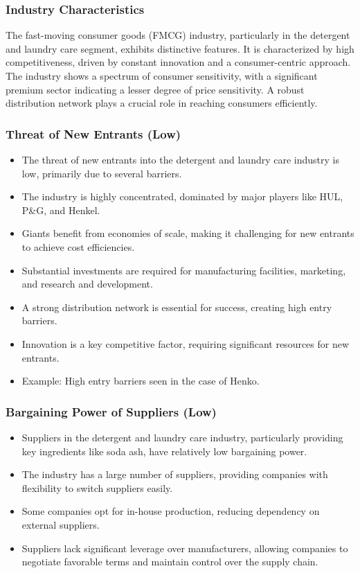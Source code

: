 \subsubsection{Industry Characteristics}
The fast-moving consumer goods (FMCG) industry, particularly in the detergent and laundry care segment, exhibits distinctive features. It is characterized by high competitiveness, driven by constant innovation and a consumer-centric approach. The industry shows a spectrum of consumer sensitivity, with a significant premium sector indicating a lesser degree of price sensitivity. A robust distribution network plays a crucial role in reaching consumers efficiently.

\subsubsection{Threat of New Entrants (Low)}
\begin{itemize}
  \item The threat of new entrants into the detergent and laundry care industry is low, primarily due to several barriers.
  \item The industry is highly concentrated, dominated by major players like HUL, P\&G, and Henkel.
  \item Giants benefit from economies of scale, making it challenging for new entrants to achieve cost efficiencies.
  \item Substantial investments are required for manufacturing facilities, marketing, and research and development.
  \item A strong distribution network is essential for success, creating high entry barriers.
  \item Innovation is a key competitive factor, requiring significant resources for new entrants.
  \item Example: High entry barriers seen in the case of Henko.
\end{itemize}

\subsubsection{Bargaining Power of Suppliers (Low)}
\begin{itemize}
  \item Suppliers in the detergent and laundry care industry, particularly providing key ingredients like soda ash, have relatively low bargaining power.
  \item The industry has a large number of suppliers, providing companies with flexibility to switch suppliers easily.
  \item Some companies opt for in-house production, reducing dependency on external suppliers.
  \item Suppliers lack significant leverage over manufacturers, allowing companies to negotiate favorable terms and maintain control over the supply chain.
\end{itemize}

